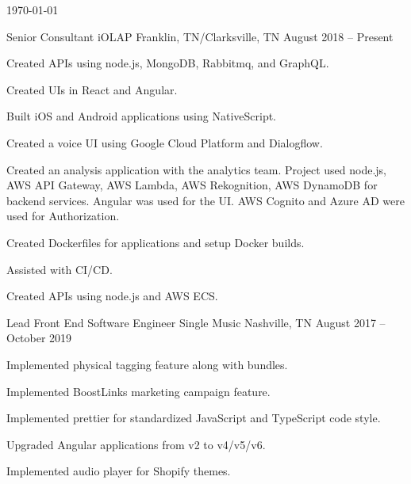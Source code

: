 \documentclass[letterpaper]{awesome-cv}
\begin{document}
\makecvfooter
{\today}
{}
{\thepage}

\makecvheader[C]

\begin{cventries}
  \cventry
    {Senior Consultant}
    {iOLAP}
    {Franklin, TN/Clarksville, TN}
    {August 2018 – Present}
    {\begin{cvitems}
      \item {Created APIs using node.js, MongoDB, Rabbitmq, and GraphQL.}
      \item {Created UIs in React and Angular.}
      \item {Built iOS and Android applications using NativeScript.}
      \item {Created a voice UI using Google Cloud Platform and Dialogflow.}
      \item {Created an analysis application with the analytics team. Project used node.js, AWS API Gateway, AWS Lambda, AWS Rekognition, AWS DynamoDB for backend services. Angular was used for the UI. AWS Cognito and Azure AD were used for Authorization.}
      \item {Created Dockerfiles for applications and setup Docker builds.}
      \item {Assisted with CI/CD.}
      \item {Created APIs using node.js and AWS ECS.}
      \end{cvitems}}

  \cventry
    {Lead Front End Software Engineer}
    {Single Music}
    {Nashville, TN}
    {August 2017 – October 2019}
    {\begin{cvitems}
      \item {Implemented physical tagging feature along with bundles.}
      \item {Implemented BoostLinks marketing campaign feature.}
      \item {Implemented prettier for standardized JavaScript and TypeScript code style.}
      \item {Upgraded Angular applications from v2 to v4/v5/v6.}
      \item {Implemented audio player for Shopify themes.}
      \end{cvitems}}


\end{cventries}
\end{document}
